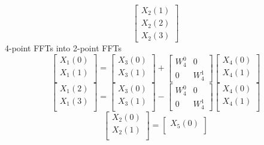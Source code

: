 \documentclass[journal,12pt,twocolumn]{IEEEtran}
\renewcommand\thesection{\arabic{section}}
\begin{document}
\begin{enumerate}[label=\arabic*.,ref=\thesection.\theenumi]
\begin{equation}
\begin{bmatrix}
			X_{2}(1) \\ 
			X_{2}(2) \\
			X_{2}(3)
		\end{bmatrix}
	\end{equation}
	4-point FFTs into 2-point FFTs
	\begin{equation}
		\begin{bmatrix}
			X_{1}(0) \\ 
			X_{1}(1)\\ 
		\end{bmatrix}
		=
		\begin{bmatrix}
			X_{3}(0) \\ 
			X_{3}(1)\\ 
		\end{bmatrix}
		+
		\begin{bmatrix}
			W^{0}_{4} & 0\\
			0 & W^{1}_{4}
		\end{bmatrix}
		\begin{bmatrix}
			X_{4}(0) \\ 
			X_{4}(1) \\ 
		\end{bmatrix}
	\end{equation}
	\begin{equation}
		\begin{bmatrix}
			X_{1}(2) \\ 
			X_{1}(3)\\ 
		\end{bmatrix}
		=
		\begin{bmatrix}
			X_{3}(0) \\ 
			X_{3}(1)\\ 
		\end{bmatrix}
		-
		\begin{bmatrix}
			W^{0}_{4} & 0\\
			0 & W^{1}_{4}
		\end{bmatrix}
		\begin{bmatrix}
			X_{4}(0) \\ 
			X_{4}(1) \\ 
		\end{bmatrix}
	\end{equation}
	\begin{equation}
		\begin{bmatrix}
			X_{2}(0) \\ 
			X_{2}(1)\\ 
		\end{bmatrix}
		=
		\begin{bmatrix}
			X_{5}(0) \\ 

\end{bmatrix}
\end{equation}
\end{enumerate}
\end{document}
